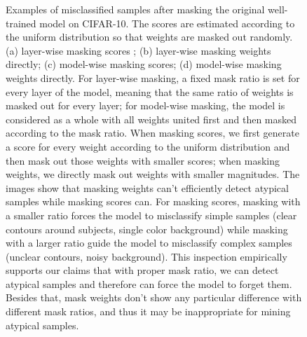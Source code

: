 \documentclass{article}
\theoremstyle{plain}
\theoremstyle{definition}
\theoremstyle{remark}
\begin{document}
\begin{figure}[t!]
    \begin{center}
    \end{center}
    \caption{Examples of misclassified samples after masking the original well-trained model on CIFAR-10. The scores are estimated according to the uniform distribution so that weights are masked out randomly. (a) layer-wise masking scores \citep{ramanujan2020s}; (b) layer-wise masking weights directly; (c) model-wise masking scores; (d) model-wise masking weights directly. For layer-wise masking, a fixed mask ratio is set for every layer of the model, meaning that the same ratio of weights is masked out for every layer; for model-wise masking, the model is considered as a whole with all weights united first and then masked according to the mask ratio. When masking scores, we first generate a score for every weight according to the uniform distribution and then mask out those weights with smaller scores; when masking weights, we directly mask out weights with smaller magnitudes. The images show that masking weights can't efficiently detect atypical samples while masking scores can. For masking scores, masking with a smaller ratio forces the model to misclassify simple samples (clear contours around subjects, single color background) while masking with a larger ratio guide the model to misclassify complex samples (unclear contours, noisy background). This inspection empirically supports our claims that with proper mask ratio, we can detect atypical samples and therefore can force the model to forget them. Besides that, mask weights don't show any particular difference with different mask ratios, and thus it may be inappropriate for mining atypical samples.}
    \label{fig17:mine_atypical}
\end{figure}
\end{document}
